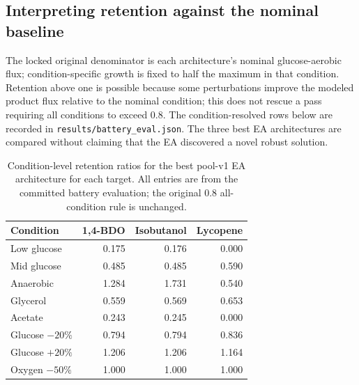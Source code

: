 \subsection{Interpreting retention against the nominal baseline}
The locked original denominator is each architecture's nominal glucose-aerobic flux; condition-specific growth is fixed to half the maximum in that condition. Retention above one is possible because some perturbations improve the modeled product flux relative to the nominal condition; this does not rescue a pass requiring all conditions to exceed 0.8. The condition-resolved rows below are recorded in \texttt{results/battery\_eval.json}. The three best EA architectures are compared without claiming that the EA discovered a novel robust solution.
\begin{table}[!htbp]\centering\small\caption{Condition-level retention ratios for the best pool-v1 EA architecture for each target. All entries are from the committed battery evaluation; the original 0.8 all-condition rule is unchanged.}\begin{tabular}{lrrr}\hline Condition & 1,4-BDO & Isobutanol & Lycopene \\\hline
Low glucose & 0.175 & 0.176 & 0.000 \\
Mid glucose & 0.485 & 0.485 & 0.590 \\
Anaerobic & 1.284 & 1.731 & 0.540 \\
Glycerol & 0.559 & 0.569 & 0.653 \\
Acetate & 0.243 & 0.245 & 0.000 \\
Glucose $-20\%$ & 0.794 & 0.794 & 0.836 \\
Glucose $+20\%$ & 1.206 & 1.206 & 1.164 \\
Oxygen $-50\%$ & 1.000 & 1.000 & 1.000 \\
\hline\end{tabular}\end{table}
